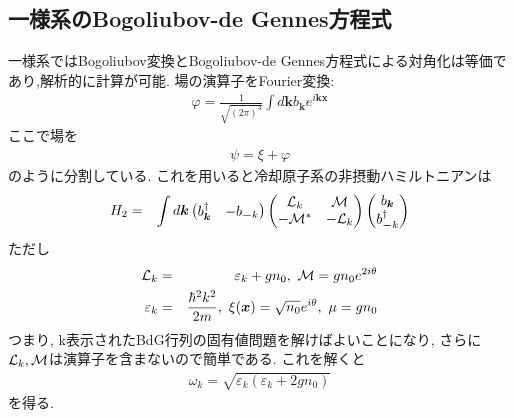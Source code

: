 \documentclass[10.5pt,a4paper]{jreport}
\newcommand{\calM}{{\cal M}}
\newcommand{\calL}{{\cal L}}
\begin{document}
\subsection{一様系のBogoliubov-de Gennes方程式}
一様系ではBogoliubov変換とBogoliubov-de Gennes方程式による対角化は等価であり,解析的に計算が可能. 場の演算子をFourier変換:
\begin{eqnarray}
  \varphi = \frac{1}{\sqrt{(2\pi)^3}}\int d\bm{k} b_{\bm k}e^{i\bm{kx}}
\end{eqnarray}
ここで場を
\begin{eqnarray}
  \psi = \xi + \varphi
\end{eqnarray}
のように分割している. これを用いると冷却原子系の非摂動ハミルトニアンは
\begin{eqnarray}
  H_2 &=& \int d\bm{k}
  \begin{pmatrix}
    b_{\bm k}^\dagger &-b_{\bm -k} 
  \end{pmatrix}
  \begin{pmatrix}
    \calL_k &\calM\\
    -\calM^* &-\calL_k
  \end{pmatrix}
  \begin{pmatrix}
    b_{\bm k}\\
    b_{\bm -k}^\dagger 
  \end{pmatrix}
\end{eqnarray}
ただし
\begin{eqnarray}
  \calL_k &=& \varepsilon_k + gn_0,\ \calM = gn_0e^{2i\theta}\\
  \varepsilon_k &=& \frac{\hbar^2k^2}{2m},\ \xi(\bm{x}) = \sqrt{n_0}e^{i\theta},\ \mu = gn_0
\end{eqnarray}
つまり, k表示されたBdG行列の固有値問題を解けばよいことになり, さらに$\calL_k, \calM$は演算子を含まないので簡単である. これを解くと
\begin{eqnarray}
  \omega_k = \sqrt{\varepsilon_k(\varepsilon_k + 2gn_0)}
\end{eqnarray}
を得る.
\end{document}
